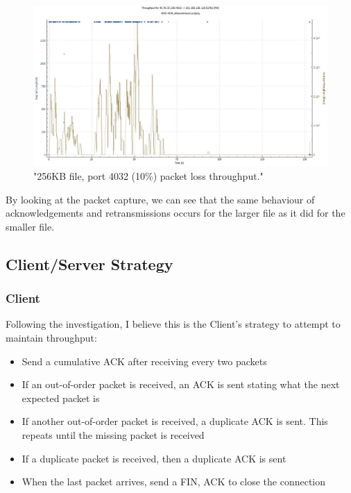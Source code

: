 \documentclass[12pt]{article}
\begin{document}
\begin{figure}[!htbp]
  \centering
  \includegraphics[width=\linewidth]{4032-16M-throughput.jpeg}
  \caption{"256KB file, port 4032 (10\%) packet loss throughput."}
  \label{figure6: 4032:16M Throughput}
\end{figure}

By looking at the packet capture, we can see that the same behaviour of acknowledgements and retransmissions occurs for the larger file as it did for the smaller file.


\subsection*{Client/Server Strategy}
\subsubsection*{Client}
Following the investigation, I believe this is the Client's strategy to attempt to maintain throughput:
\begin{itemize}
  \item Send a cumulative ACK after receiving every two packets
  \item If an out-of-order packet is received, an ACK is sent stating what the next expected packet is
  \item If another out-of-order packet is received, a duplicate ACK is sent. This repeats until the missing packet is received
  \item If a duplicate packet is received, then a duplicate ACK is sent
  \item When the last packet arrives, send a FIN, ACK to close the connection
\end{itemize}
\end{document}
